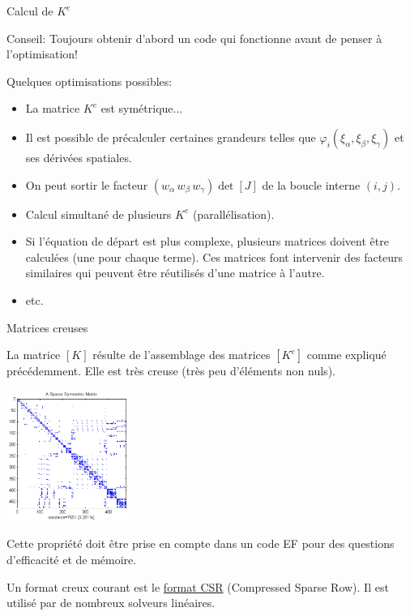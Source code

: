 \documentclass[
mode=present,    %
paper=a4paper,   %
orient=landscape,
display=slides,   %
size=10pt,     %
style=romain   %
]{powerdot}
\begin{document}
\begin{slide}[method=file,toc=]{Calcul de $K^e$}  %

Conseil: Toujours obtenir d'abord un code qui fonctionne avant de penser à l'optimisation!

\bigskip

Quelques optimisations possibles:
\begin{itemize}
\item La matrice $K^e$ est symétrique...
\item Il est possible de précalculer certaines grandeurs telles que $\varphi_i(\xi_{\alpha},\xi_{\beta},\xi_{\gamma})$ et ses dérivées spatiales.
\item On peut sortir le facteur $(w_{\alpha}\,w_{\beta}\,w_{\gamma})\det [J]$ de la boucle interne $(i,j)$.
\item Calcul simultané de plusieurs $K^e$ (parallélisation).
\item Si l'équation de départ est plus complexe, plusieurs matrices doivent être calculées (une pour chaque terme). Ces matrices font intervenir des facteurs similaires qui peuvent être réutilisés d'une matrice à l'autre.
\item etc.
\end{itemize}


\end{slide}


\begin{slide}[method=file,toc=Matrices creuses]{Matrices creuses}  %

La matrice $[K]$ résulte de l'assemblage des matrices $[K^e]$ comme expliqué précédemment. Elle est très creuse (très peu d'éléments non nuls).

    \centerline{\includegraphics[width=0.3\textwidth]{sparse.eps} }

Cette propriété doit être prise en compte dans un code EF pour des questions d'efficacité et de mémoire.

\bigskip

Un format creux courant est le \href{http://en.wikipedia.org/wiki/Sparse_matrix}{format CSR} (Compressed Sparse Row). Il est utilisé par de nombreux solveurs linéaires.

\end{slide}
\end{document}
